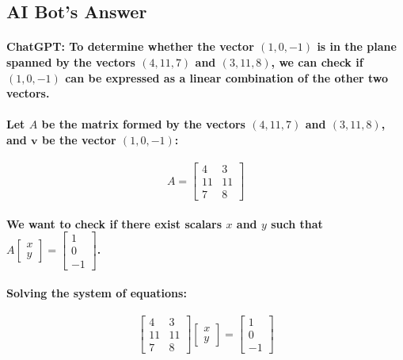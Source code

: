 \documentclass[11pt]{article} %
\begin{document}
\subsection{AI Bot's Answer}
\begin{mdframed}[
        backgroundcolor=white,  %
        linecolor=black,        %
        leftmargin=5pt,         %
        rightmargin=5pt,        %
        linewidth=2pt           %
    ]
    \paragraph{\textbf{ChatGPT}: To determine whether the vector \( (1, 0, -1) \) is in the plane spanned by the vectors \( (4, 11, 7) \) and \( (3, 11, 8) \), we can check if \( (1, 0, -1) \) can be expressed as a linear combination of the other two vectors.}
    \paragraph{Let \( A \) be the matrix formed by the vectors \( (4, 11, 7) \) and \( (3, 11, 8) \), and \( \mathbf{v} \) be the vector \( (1, 0, -1) \):}
    \[ A = \begin{bmatrix} 4 & 3 \\ 11 & 11 \\ 7 & 8 \end{bmatrix} \]
    \paragraph{We want to check if there exist scalars \( x \) and \( y \) such that \( A \begin{bmatrix} x \\ y \end{bmatrix} = \begin{bmatrix} 1 \\ 0 \\ -1 \end{bmatrix} \).}
    \paragraph{Solving the system of equations:}
    \[ \begin{bmatrix} 4 & 3 \\ 11 & 11 \\ 7 & 8 \end{bmatrix} \begin{bmatrix} x \\ y \end{bmatrix} = \begin{bmatrix} 1 \\ 0 \\ -1 \end{bmatrix} \]

\end{mdframed}
\end{document}
